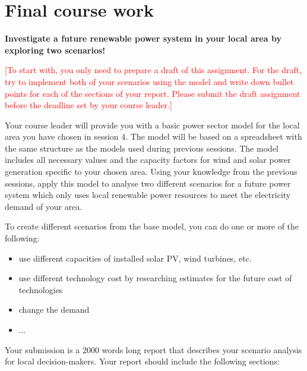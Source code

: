 \section{Final course work}

\textbf{Investigate a future renewable power system in your local area by exploring two scenarios!}


\textcolor{red}{[To start with, you only need to prepare a draft of this assignment. For the draft, try to implement both of your scenarios using the model and write down bullet points for each of the sections of your report. Please submit the draft assignment before the deadline set by your course leader.]}

Your course leader will provide you with a basic power sector model for the local area you have chosen in session 4. The model will be based on a spreadsheet with the same structure as the models used during previous sessions. The model includes all necessary values and the capacity factors for wind and solar power generation specific to your chosen area. Using your knowledge from the previous sessions, apply this model to analyse two different scenarios for a future power system which only uses local renewable power resources to meet the electricity demand of your area.

To create different scenarios from the base model, you can do one or more of the following:

\begin{itemize}
\item use different capacities of installed solar PV, wind turbines, etc.
\item use different technology cost by researching estimates for the future cost of technologies
\item change the demand
\item ...
\end{itemize}


Your submission is a 2000 words long report that describes your scenario analysis for local decision-makers. Your report should include the following sections:

